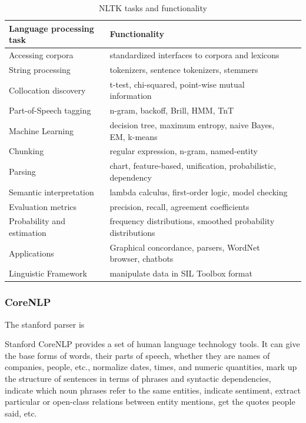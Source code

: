 \documentclass[10pt, letterpaper, twoside, openany]{book}
\begin{document}
\begin{table}
	\begin{tabular}{ | p{4cm} | p{7cm} | p{1cm} |}
		\hline
		\textbf{Language processing task} & \textbf{Functionality} \\ \hline
		Accessing corpora & standardized interfaces to corpora and lexicons \\ \hline
		String processing & tokenizers, sentence tokenizers, stemmers \\ \hline
		Collocation discovery & t-test, chi-squared, point-wise mutual information \\ \hline
		Part-of-Speech tagging & n-gram, backoff, Brill, HMM, TnT \\ \hline
		Machine Learning & decision tree, maximum entropy, naive Bayes, EM, k-means \\ \hline
		Chunking & regular expression, n-gram, named-entity \\ \hline
		Parsing & chart, feature-based, unification, probabilistic, dependency \\ \hline
		Semantic interpretation & lambda calculus, first-order logic, model checking \\ \hline
		Evaluation metrics & precision, recall, agreement coefficients \\ \hline
		Probability and estimation & frequency distributions, smoothed probability distributions \\ \hline
		Applications & Graphical concordance, parsers, WordNet browser, chatbots \\ \hline
		Linguistic Framework & manipulate data in SIL Toolbox format \\ \hline
	\end{tabular}
		\caption{\label{tab:table-name}NLTK tasks and functionality}
\end{table}

\subsubsection{CoreNLP}
The stanford parser is

Stanford CoreNLP provides a set of human language technology tools. It can give the base forms of words, their parts of speech, whether they are names of companies, people, etc., normalize dates, times, and numeric quantities, mark up the structure of sentences in terms of phrases and syntactic dependencies, indicate which noun phrases refer to the same entities, indicate sentiment, extract particular or open-class relations between entity mentions, get the quotes people said, etc.
\end{document}
